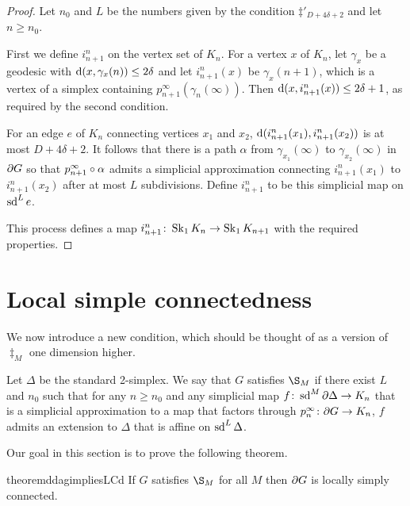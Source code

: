 \documentclass[a4paper]{article}
\begin{document}
\begin{proof}
  Let $n_0$ and $L$ be the numbers given by the condition $\ddag'_{D + 4\delta
  + 2}$ and let $n \geq n_0$.

  First we define $i^n_{n+1}$ on the vertex set of $K_n$. For a vertex $x$ of
  $K_n$, let $\gamma_x$ be a geodesic with $\operatorname{d}(x, \gamma_x(n)) \leq 2\delta$
  and let $i^n_{n+1}(x)$ be $\gamma_x(n+1)$, which is a vertex of a simplex
  containing $p^\infty_{n+1}(\gamma_n(\infty))$. Then $\operatorname{d}(x, i^n_{n+1}(x))
  \leq 2\delta + 1$, as required by the second condition.

  For an edge $e$ of $K_n$ connecting vertices $x_1$ and $x_2$,
  $\operatorname{d}(i^n_{n+1}(x_1), i^n_{n+1}(x_2))$ is at most $D + 4\delta + 2$. It
  follows that there is a path $\alpha$ from $\gamma_{x_1}(\infty)$ to
  $\gamma_{x_2}(\infty)$ in $\partial G$ so that
  $p^\infty_{n+1}\circ\alpha$ admits a simplicial approximation connecting
  $i^n_{n+1}(x_1)$ to $i^n_{n+1}(x_2)$ after at most $L$ subdivisions. Define
  $i^n_{n+1}$ to be this simplicial map on $\operatorname{sd}^L e$.

  This process defines a map $i^n_{n+1}\colon \operatorname{Sk}_1 K_n\to \operatorname{Sk}_1 K_{n+1}$
  with the required properties.
\end{proof}

\section{Local simple connectedness}

We now introduce a new condition, which should be thought of as a version of
$\ddag_M$ one dimension higher.

\begin{definition}
  Let $\Delta$ be the standard 2-simplex.  We say that $G$ satisfies $\S_M$ if
  there exist $L$ and $n_0$ such that for any $n\geq n_0$ and any simplicial
  map $f\colon \operatorname{sd}^M\partial\Delta \to K_n$ that is a simplicial approximation
  to a map that factors through $p^\infty_n \colon \partial G \to K_n$, $f$
  admits an extension to $\Delta$ that is affine on $\operatorname{sd}^L \Delta$.
\end{definition}

Our goal in this section is to prove the following theorem.

\begin{restatable}{theorem}{ddagimpliesLCd}\label{thm:ddagimpliesLCd}
  If $G$ satisfies $\S_M$ for all $M$ then $\partial G$ is locally simply
  connected.
\end{restatable}
\end{document}
